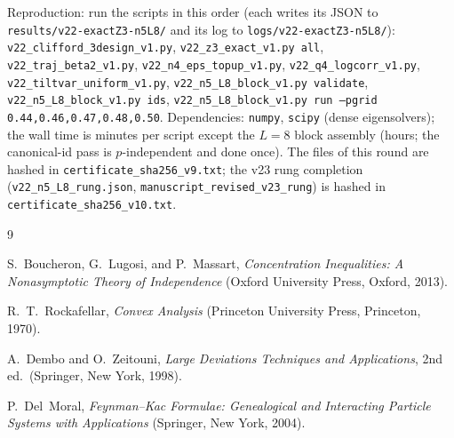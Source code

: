 \documentclass[aps,prx,reprint,superscriptaddress,nobibnotes,longbibliography]{revtex4-2}
\begin{document}
Reproduction: run the scripts in this order (each writes its JSON to
\texttt{results/v22-exactZ3-n5L8/} and its log to
\texttt{logs/v22-exactZ3-n5L8/}): \texttt{v22\_clifford\_3design\_v1.py},
\texttt{v22\_z3\_exact\_v1.py all},
\texttt{v22\_traj\_beta2\_v1.py},
\texttt{v22\_n4\_eps\_topup\_v1.py},
\texttt{v22\_q4\_logcorr\_v1.py},
\texttt{v22\_tiltvar\_uniform\_v1.py},
\texttt{v22\_n5\_L8\_block\_v1.py validate},
\texttt{v22\_n5\_L8\_block\_v1.py ids},
\texttt{v22\_n5\_L8\_block\_v1.py run --pgrid 0.44,0.46,0.47,0.48,0.50}.
Dependencies: \texttt{numpy}, \texttt{scipy} (dense eigensolvers); the
wall time is minutes per script except the $L=8$ block assembly (hours;
the canonical-id pass is $p$-independent and done once).  The files of
this round are hashed in \texttt{certificate\_sha256\_v9.txt}; the v23 rung
completion (\texttt{v22\_n5\_L8\_rung.json}, \texttt{manuscript\_revised\_v23\_rung})
is hashed in \texttt{certificate\_sha256\_v10.txt}.

\begin{thebibliography}{9}

 S.~Boucheron, G.~Lugosi, and P.~Massart,
\emph{Concentration Inequalities: A Nonasymptotic Theory of Independence}
(Oxford University Press, Oxford, 2013).

 R.~T.~Rockafellar, \emph{Convex Analysis}
(Princeton University Press, Princeton, 1970).

 A.~Dembo and O.~Zeitouni, \emph{Large
Deviations Techniques and Applications}, 2nd ed.\ (Springer, New York,
1998).

 P.~Del~Moral, \emph{Feynman--Kac Formulae:
Genealogical and Interacting Particle Systems with Applications}
(Springer, New York, 2004).

\end{thebibliography}
\end{document}
